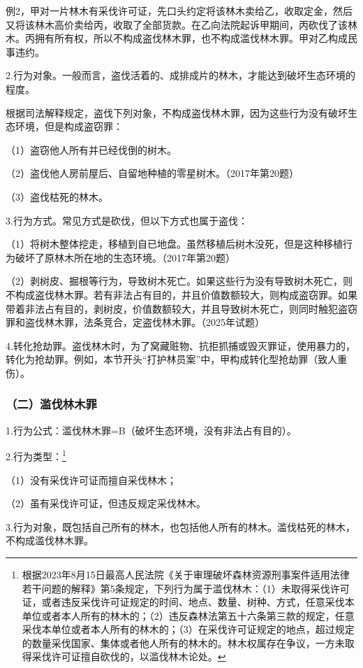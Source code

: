 例2，甲对一片林木有采伐许可证，先口头约定将该林木卖给乙，收取定金，然后又将该林木高价卖给丙，收取了全部货款。在乙向法院起诉甲期间，丙砍伐了该林木。丙拥有所有权，所以不构成盗伐林木罪，也不构成滥伐林木罪。甲对乙构成民事违约。

2.行为对象。一般而言，盗伐活着的、成排成片的林木，才能达到破坏生态环境的程度。

根据司法解释规定，盗伐下列对象，不构成盗伐林木罪，因为这些行为没有破坏生态环境，但是构成盗窃罪：

（1）盗窃他人所有并已经伐倒的树木。

（2）盗伐他人房前屋后、自留地种植的零星树木。（2017年第20题）

（3）盗伐枯死的林木。

3.行为方式。常见方式是砍伐，但以下方式也属于盗伐：

（1）将树木整体挖走，移植到自已地盘。虽然移植后树木没死，但是这种移植行为破坏了原林木所在地的生态环境。（2017年第20题）

（2）剥树皮、掘根等行为，导致树木死亡。如果这些行为没有导致树木死亡，则不构成盗伐林木罪。若有非法占有目的，并且价值数额较大，则构成盗窃罪。如果带着非法占有目的，剥树皮，价值数额较大，并且导致树木死亡，则同时触犯盗窃罪和盗伐林木罪，法条竞合，定盗伐林木罪。（2025年试题）

4.转化抢劫罪。盗伐林木时，为了窝藏赃物、抗拒抓捕或毁灭罪证，使用暴力的，转化为抢劫罪。例如，本节开头“打护林员案”中，甲构成转化型抢劫罪（致人重伤）。

\subsubsection*{（二）滥伐林木罪}

1.行为公式：滥伐林木罪=B（破坏生态环境，没有非法占有目的）。

2.行为类型：\footnote{根据2023年8月15日最高人民法院《关于审理破坏森林资源刑事案件适用法律若干问题的解释》第5条规定，下列行为属于滥伐林木：（1）未取得采伐许可证，或者违反采伐许可证规定的时间、地点、数量、树种、方式，任意采伐本单位或者本人所有的林木的；（2）违反森林法第五十六条第三款的规定，任意采伐本单位或者本人所有的林木的；（3）在采伐许可证规定的地点，超过规定的数量采伐国家、集体或者他人所有的林木的。林木权属存在争议，一方未取得采伐许可证擅自砍伐的，以滥伐林木论处。}

（1）没有采伐许可证而擅自采伐林木；

（2）虽有采伐许可证，但违反规定采伐林木。

3.行为对象，既包括自己所有的林木，也包括他人所有的林木。滥伐枯死的林木，不构成滥伐林木罪。

